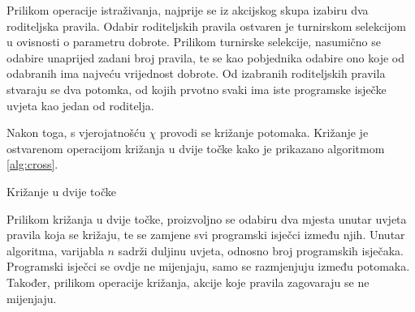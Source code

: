 \documentclass[times, utf8, zavrsni]{fer}
\begin{document}
Prilikom operacije istraživanja, najprije se iz akcijskog skupa izabiru dva roditeljska pravila.
Odabir roditeljskih pravila ostvaren je turnirskom selekcijom  u ovisnosti o parametru dobrote.
Prilikom turnirske selekcije, nasumično se odabire unaprijed zadani broj pravila, te se kao pobjednika odabire ono koje od odabranih ima najveću vrijednost dobrote.
Od izabranih roditeljskih pravila stvaraju se dva potomka, od kojih prvotno svaki ima iste programske isječke uvjeta kao jedan od roditelja.

Nakon toga, s vjerojatnošću $\chi$ provodi se križanje potomaka.
Križanje je ostvarenom operacijom križanja u dvije točke  kako je prikazano algoritmom \ref{alg:cross}.
\begin{algorithm}[h]
    \caption{Križanje u dvije točke}
    \label{alg:cross}
    \begin{algorithmic}
        \STATE{$x :=$ proizvoljan decimalni broj iz intervala [0, n)}
        \STATE{$y :=$ proizvoljan decimalni broj iz intervala [0, n)}
        \ENDIF
        \ENDFOR
    \end{algorithmic}
\end{algorithm}
Prilikom križanja u dvije točke, proizvoljno se odabiru dva mjesta unutar uvjeta pravila koja se križaju, te se zamjene svi programski isječci između njih.
Unutar algoritma, varijabla $n$ sadrži duljinu uvjeta, odnosno broj programskih isječaka.
Programski isječci se ovdje ne mijenjaju, samo se razmjenjuju između potomaka.
Također, prilikom operacije križanja, akcije koje pravila zagovaraju se ne mijenjaju.
\end{document}
